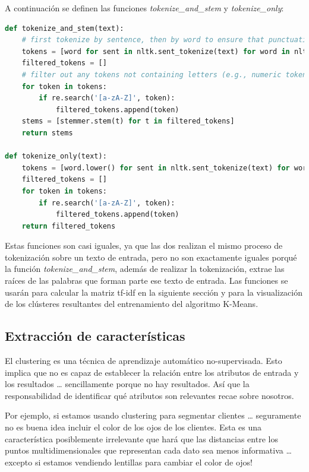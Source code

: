 \documentclass{uimppracticas}
\begin{document}
A continuación se definen las funciones \textit{tokenize\_and\_stem} y \textit{tokenize\_only}: 

\begin{lstlisting}[language=python]
def tokenize_and_stem(text):
	# first tokenize by sentence, then by word to ensure that punctuation is caught as it's own token
	tokens = [word for sent in nltk.sent_tokenize(text) for word in nltk.word_tokenize(sent)]
	filtered_tokens = []
	# filter out any tokens not containing letters (e.g., numeric tokens, raw punctuation)
	for token in tokens:
		if re.search('[a-zA-Z]', token):
			filtered_tokens.append(token)
	stems = [stemmer.stem(t) for t in filtered_tokens]
	return stems
	
def tokenize_only(text):
	tokens = [word.lower() for sent in nltk.sent_tokenize(text) for word in nltk.word_tokenize(sent)]
	filtered_tokens = []
	for token in tokens:
		if re.search('[a-zA-Z]', token):
			filtered_tokens.append(token)
	return filtered_tokens  
\end{lstlisting}

Estas funciones son casi iguales, ya que las dos realizan el mismo proceso de tokenización sobre un texto de entrada, pero no son exactamente iguales porqué la función \textit{tokenize\_and\_stem}, además de realizar la tokenización, extrae las raíces de las palabras que forman parte ese texto de entrada. Las funciones se usarán para calcular la matriz tf-idf en la siguiente sección y para la visualización de los clústeres resultantes del entrenamiento del algoritmo K-Means.

\subsection{Extracción de características}

El clustering es una técnica de aprendizaje automático no-supervisada. Esto implica que no es capaz de establecer la relación entre los atributos de entrada y los resultados … sencillamente porque no hay resultados. Así que la responsabilidad de identificar qué atributos son relevantes recae sobre nosotros.

Por ejemplo, si estamos usando clustering para segmentar clientes … seguramente no es buena idea incluir el color de los ojos de los clientes. Esta es una característica posiblemente irrelevante que hará que las distancias entre los puntos multidimensionales que representan cada dato sea menos informativa … excepto si estamos vendiendo lentillas para cambiar el color de ojos!
\end{document}
